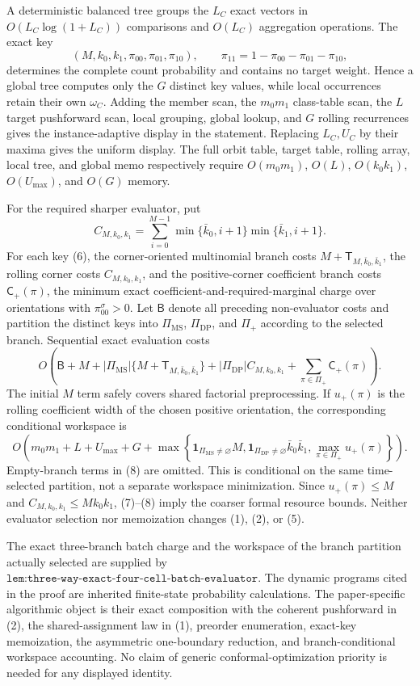 A deterministic balanced tree groups the \(L_C\) exact vectors in \(O(L_C\log(1+L_C))\) comparisons and \(O(L_C)\) aggregation operations. The exact key
\[
(M,k_0,k_1,\pi_{00},\pi_{01},\pi_{10}),\qquad \pi_{11}=1-\pi_{00}-\pi_{01}-\pi_{10},
\tag{6}
\]
determines the complete count probability and contains no target weight. Hence a global tree computes only the \(G\) distinct key values, while local occurrences retain their own \(\omega_C\). Adding the member scan, the \(m_0m_1\) class-table scan, the \(L\) target pushforward scan, local grouping, global lookup, and \(G\) rolling recurrences gives the instance-adaptive display in the statement. Replacing \(L_C,U_C\) by their maxima gives the uniform display. The full orbit table, target table, rolling array, local tree, and global memo respectively require \(O(m_0m_1)\), \(O(L)\), \(O(k_0k_1)\), \(O(U_{\max})\), and \(O(G)\) memory.

For the required sharper evaluator, put
\[
C_{M,k_0,k_1}=\sum_{i=0}^{M-1}\min\{\bar k_0,i+1\}\min\{\bar k_1,i+1\}.
\]
For each key (6), the corner-oriented multinomial branch costs \(M+\mathsf T_{M,\bar k_0,\bar k_1}\), the rolling corner costs \(C_{M,k_0,k_1}\), and the positive-corner coefficient branch costs \(\mathsf C_+(\pi)\), the minimum exact coefficient-and-required-marginal charge over orientations with \(\pi^\sigma_{00}>0\). Let \(\mathsf B\) denote all preceding non-evaluator costs and partition the distinct keys into \(\Pi_{\mathrm{MS}}\), \(\Pi_{\mathrm{DP}}\), and \(\Pi_+\) according to the selected branch. Sequential exact evaluation costs
\[
O\!\left(\mathsf B+M+|\Pi_{\mathrm{MS}}|\{M+\mathsf T_{M,\bar k_0,\bar k_1}\}+|\Pi_{\mathrm{DP}}|C_{M,k_0,k_1}+\sum_{\pi\in\Pi_+}\mathsf C_+(\pi)\right).
\tag{7}
\]
The initial \(M\) term safely covers shared factorial preprocessing. If \(u_+(\pi)\) is the rolling coefficient width of the chosen positive orientation, the corresponding conditional workspace is
\[
O\!\left(m_0m_1+L+U_{\max}+G+\max\left\{\mathbf 1_{\Pi_{\mathrm{MS}}\ne\varnothing}M,\mathbf 1_{\Pi_{\mathrm{DP}}\ne\varnothing}\bar k_0\bar k_1,\max_{\pi\in\Pi_+}u_+(\pi)\right\}\right).
\tag{8}
\]
Empty-branch terms in (8) are omitted. This is conditional on the same time-selected partition, not a separate workspace minimization. Since \(u_+(\pi)\le M\) and \(C_{M,k_0,k_1}\le Mk_0k_1\), (7)--(8) imply the coarser formal resource bounds. Neither evaluator selection nor memoization changes (1), (2), or (5).

The exact three-branch batch charge and the workspace of the branch partition actually selected are supplied by \(\texttt{lem:three-way-exact-four-cell-batch-evaluator}\). The dynamic programs cited in the proof are inherited finite-state probability calculations. The paper-specific algorithmic object is their exact composition with the coherent pushforward in (2), the shared-assignment law in (1), preorder enumeration, exact-key memoization, the asymmetric one-boundary reduction, and branch-conditional workspace accounting. No claim of generic conformal-optimization priority is needed for any displayed identity.